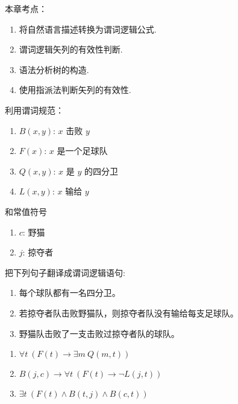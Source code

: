 \documentclass[cn, hazy, blue, normal, 12pt]{elegantnote}
\begin{document}
本章考点：

\begin{enumerate}
    \item 将自然语言描述转换为谓词逻辑公式.
    \item 谓词逻辑矢列的有效性判断.
    \item 语法分析树的构造.
    \item 使用指派法判断矢列的有效性.
\end{enumerate}



\begin{exercise}

    利用谓词规范：
    \begin{enumerate}
        \item $B(x,y)$: $x$ 击败 $y$
        \item $F(x)$: $x$ 是一个足球队
        \item $Q(x,y)$: $x$ 是 $y$ 的四分卫
        \item $L(x,y)$: $x$ 输给 $y$
    \end{enumerate}
    和常值符号
    \begin{enumerate}
        \item $c$: 野猫
        \item $j$: 掠夺者
    \end{enumerate}
    把下列句子翻译成谓词逻辑语句:
    \begin{enumerate}
        \item 每个球队都有一名四分卫。
        \item 若掠夺者队击败野猫队，则掠夺者队没有输给每支足球队。
        \item 野猫队击败了一支击败过掠夺者队的球队。
    \end{enumerate}

\end{exercise}

\begin{solution}[print=true]

    \begin{enumerate}
        \item $\forall t~(F(t) \rightarrow \exists m~Q(m, t))$
        \item $B(j,c) \rightarrow \forall t~(F(t) \rightarrow \neg L(j,t))$
        \item $\exists t~(F(t) \wedge B(t, j) \wedge B(c, t))$
    \end{enumerate}

\end{solution}
\end{document}
